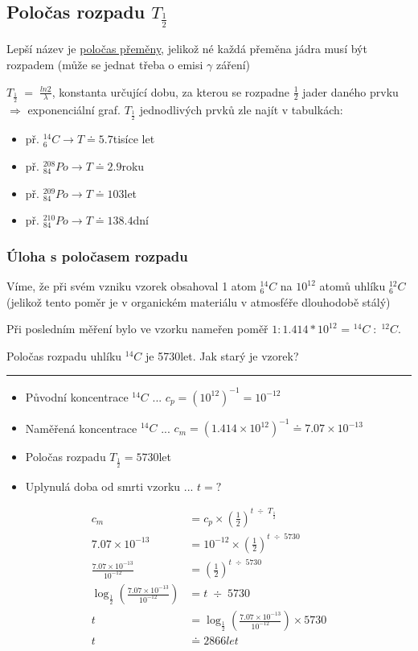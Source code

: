\subsection{Poločas rozpadu $T_\frac{1}{2}$}
Lepší název je \underline{poločas přeměny}, jelikož né každá přeměna jádra musí být rozpadem (může se jednat třeba o emisi $\gamma$ záření)

$T_{\frac{1}{2}} \; = \; \frac{ln2}{\lambda}$, konstanta určující dobu, za kterou se rozpadne $\frac{1}{2}$ jader daného prvku $\Rightarrow$ exponenciální graf.
\textbf{$T_{\frac{1}{2}}$} jednodlivých prvků zle najít v tabulkách: 
\begin{itemize}
    \item př. $^{14}_6C \rightarrow T \doteq 5.7$tisíce let
    \item př. $^{208}_{84}Po \rightarrow T \doteq 2.9$roku
    \item př. $^{209}_{84}Po \rightarrow T \doteq 103$let
    \item př. $^{210}_{84}Po \rightarrow T \doteq 138.4$dní
\end{itemize}

\newpage
\subsubsection{Úloha s poločasem rozpadu}

Víme, že při svém vzniku vzorek obsahoval 1 atom $^{14}_6C$ na $10^{12}$ atomů uhlíku $^{12}_6C$ (jelikož tento poměr je v organickém materiálu v atmosféře dlouhodobě stálý)

Při posledním měření bylo ve vzorku nameřen poměř $1 : 1.414*10^{12}$ = $^{14}C \; : \;^{12}C$.

Poločas rozpadu uhlíku $^{14}C$ je 5730let. Jak starý je vzorek?

\rule{5em}{1px}

\begin{itemize}
    \item Původní koncentrace $^{14}C$ ... $c_p = (10^{12})^{-1} = 10^{-12}$
    \item Naměřená koncentrace $^{14}C$ ... $c_m = (1.414 \times 10^{12})^{-1} \doteq 7.07 \times 10^{-13}$
    \item Poločas rozpadu $T_{\frac{1}{2}} = 5730$let
    \item Uplynulá doba od smrti vzorku ... $t = ?$
\end{itemize}

\begin{align*}
    c_{m} &= c_{p} \times \left(\frac{1}{2}\right)^{t \; \div \;  T_{\frac{1}{2}}} \\
    7.07 \times 10^{-13} &= 10^{-12} \times \left(\frac{1}{2}\right)^{t \; \div \;  5730} \\
    \frac{7.07 \times 10^{-13}}{10^{-12}} &= \left(\frac{1}{2}\right)^{t \; \div \;  5730} \\
    \log_{\frac{1}{2}}\left(\frac{7.07 \times 10^{-13}}{10^{-12}}\right) &= t \; \div \;  5730 \\
    t &= \log_{\frac{1}{2}}\left(\frac{7.07 \times 10^{-13}}{10^{-12}}\right) \times 5730 \\
    t &\doteq 2866 let
\end{align*}

